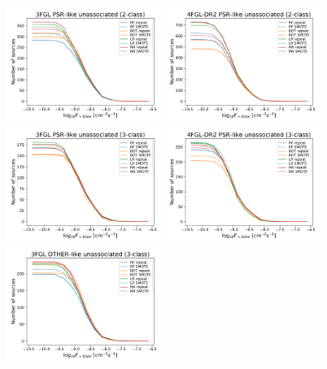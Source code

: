 \documentclass{aa}
\begin{document}
\begin{appendix}
\begin{figure}[h]
\centering
\includegraphics[width=0.45\textwidth]{plots/oversample/N_logS_3FGL_PSR_2classes_O_vs_S.pdf}
\includegraphics[width=0.45\textwidth]{plots/oversample/N_logS_4FGL-DR2_PSR_2classes_O_vs_S.pdf}\\
\includegraphics[width=0.45\textwidth]{plots/oversample/N_logS_3FGL_PSR_3classes_O_vs_S.pdf}
\includegraphics[width=0.45\textwidth]{plots/oversample/N_logS_4FGL-DR2_PSR_3classes_O_vs_S.pdf}\\
\includegraphics[width=0.45\textwidth]{plots/oversample/N_logS_3FGL_OTHER_3classes_O_vs_S.pdf}

\end{figure}
\end{appendix}
\end{document}

